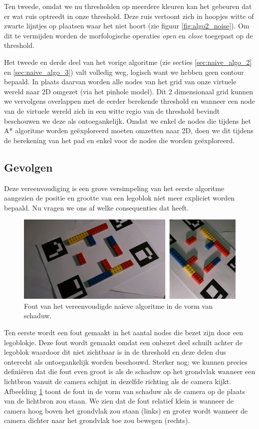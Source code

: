 Ten tweede, omdat we nu thresholden op meerdere kleuren kan het gebeuren dat er wat ruis optreedt in onze threshold. Deze ruis vertoont zich in hoopjes witte of zwarte lijntjes op plaatsen waar het niet hoort (zie figuur \ref{fig:algo2_noise}). Om dit te vermijden worden de morfologische operaties \textit{open} en \textit{close} toegepast op de threshold.

Het tweede en derde deel van het vorige algoritme (zie secties \ref{sec:naive_algo_2} en \ref{sec:naive_algo_3}) valt volledig weg, logisch want we hebben geen contour bepaald. In plaats daarvan worden alle nodes van het grid van onze virtuele wereld naar 2D omgezet (via het pinhole model). Dit 2 dimensionaal grid kunnen we vervolgens overlappen met de eerder berekende threshold en wanneer een node van de virtuele wereld zich in een witte regio van de threshold bevindt beschouwen we deze als ontoegankelijk. Omdat we enkel de nodes die tijdens het A* algoritme worden ge\"exploreerd moeten omzetten naar 2D, doen we dit tijdens de berekening van het pad en enkel voor de nodes die worden ge\"exploreerd.

\subsection{Gevolgen}
Deze vereenvoudiging is een grove versimpeling van het eerste algoritme aangezien de positie en grootte van een legoblok niet meer expliciet worden bepaald. Nu vragen we ons af welke consequenties dat heeft.

\begin{figure}
  \centering
  \includegraphics[width=\linewidth]{img/alg2Shadow}
  \caption{Fout van het vereenvoudigde na\"ieve algoritme in de vorm van schaduw.}
  \label{fig:algo2_shadow}
\end{figure}

Ten eerste wordt een fout gemaakt in het aantal nodes die bezet zijn door een legoblokje. Deze fout wordt gemaakt omdat een onbezet deel schuilt achter de legoblok waardoor dit niet zichtbaar is in de threshold en deze delen dus onterecht als ontoegankelijk worden beschouwd. Sterker nog: we kunnen precies defini\"eren dat die fout even groot is als de schaduw op het grondvlak wanneer een lichtbron vanuit de camera schijnt in dezelfde richting als de camera kijkt. Afbeelding \ref{fig:algo2_shadow} toont de fout in de vorm van schaduw als de camera op de plaats van de lichtbron zou staan. We zien dat de fout relatief klein is wanneer de camera hoog boven het grondvlak zou staan (links) en groter wordt wanneer de camera dichter naar het grondvlak toe zou bewegen (rechts).

